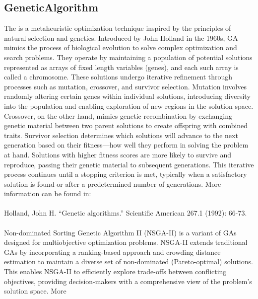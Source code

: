\subsection{GeneticAlgorithm}
  The  is a metaheuristic optimization technique inspired by the
  principles                             of natural selection and genetics. Introduced by John
  Holland in the 1960s, GA mimics the process of                             biological evolution to
  solve complex optimization and search problems. They operate by maintaining a population of
  potential solutions represented as arrays of fixed length variables (genes), and each such array
  is called a chromosome.                             These solutions undergo iterative refinement
  through processes such as mutation, crossover, and survivor selection. Mutation involves randomly
  altering certain genes within                             individual solutions, introducing
  diversity into the population and enabling exploration of new regions in the solution space.
  Crossover, on the other hand, mimics genetic recombination by exchanging genetic material between
  two parent solutions to create                             offspring with combined traits.
  Survivor selection determines which solutions will advance to the next generation based on
  their fitness—how well they perform in solving the problem at hand. Solutions with higher fitness
  scores are more likely to                             survive and reproduce, passing their genetic
  material to subsequent generations. This iterative process continues
  until a stopping criterion is met, typically when a satisfactory solution is found or after a
  predetermined number of generations.                             More information can be found
  in:\\\\                              Holland, John H. ``Genetic algorithms.'' Scientific American
  267.1 (1992): 66-73.\\\\                              Non-dominated Sorting Genetic Algorithm II
  (NSGA-II) is a variant of GAs designed for multiobjective optimization problems.
  NSGA-II extends traditional GAs by incorporating a ranking-based approach and crowding distance
  estimation to maintain a diverse set of                             non-dominated (Pareto-optimal)
  solutions. This enables NSGA-II to efficiently explore trade-offs between conflicting objectives,
  providing decision-makers with a comprehensive view of the problem's solution space. More

